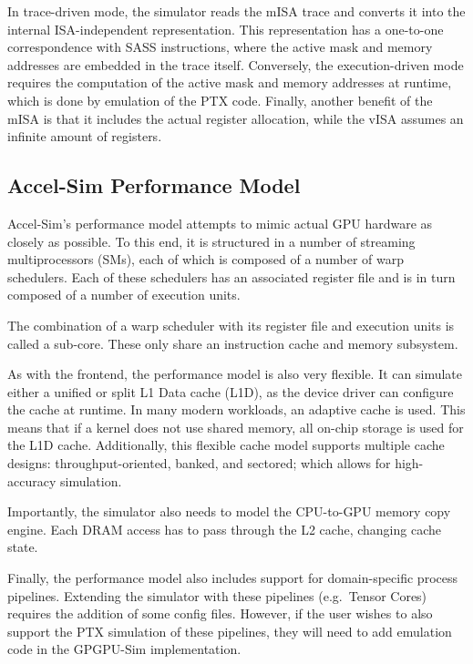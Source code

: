 In trace-driven mode, the simulator reads the mISA trace and converts it into the internal ISA-independent representation.
This representation has a one-to-one correspondence with SASS instructions, where the active mask and memory addresses are embedded in the trace itself.
Conversely, the execution-driven mode requires the computation of the active mask and memory addresses at runtime, which is done by emulation of the PTX code.
Finally, another benefit of the mISA is that it includes the actual register allocation, while the vISA assumes an infinite amount of registers.

\subsection{Accel-Sim Performance Model}\label{subsec:accelsim-performance-model}
Accel-Sim's performance model attempts to mimic actual GPU hardware as closely as possible.
To this end, it is structured in a number of streaming multiprocessors (SMs), each of which is composed of a number of warp schedulers.
Each of these schedulers has an associated register file and is in turn composed of a number of execution units.

The combination of a warp scheduler with its register file and execution units is called a sub-core.
These only share an instruction cache and memory subsystem.

\vspace{5mm}

As with the frontend, the performance model is also very flexible.
It can simulate either a unified or split L1 Data cache (L1D), as the device driver can configure the cache at runtime.
In many modern workloads, an adaptive cache is used.
This means that if a kernel does not use shared memory, all on-chip storage is used for the L1D cache.
Additionally, this flexible cache model supports multiple cache designs: throughput-oriented, banked, and sectored; which allows for high-accuracy simulation.

Importantly, the simulator also needs to model the CPU-to-GPU memory copy engine.
Each DRAM access has to pass through the L2 cache, changing cache state.

Finally, the performance model also includes support for domain-specific process pipelines.
Extending the simulator with these pipelines (e.g.\ Tensor Cores) requires the addition of some config files.
However, if the user wishes to also support the PTX simulation of these pipelines, they will need to add emulation code in the GPGPU-Sim implementation.

